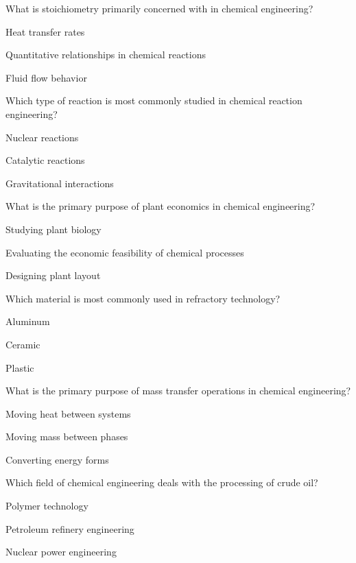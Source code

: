 \begin{enhancedmcq}{What is stoichiometry primarily concerned with in chemical engineering?}
\item Heat transfer rates
\item Quantitative relationships in chemical reactions
\item Fluid flow behavior

\end{enhancedmcq}
\begin{enhancedmcq}{Which type of reaction is most commonly studied in chemical reaction engineering?}
\item Nuclear reactions
\item Catalytic reactions
\item Gravitational interactions

\end{enhancedmcq}
\begin{enhancedmcq}{What is the primary purpose of plant economics in chemical engineering?}
\item Studying plant biology
\item Evaluating the economic feasibility of chemical processes
\item Designing plant layout

\end{enhancedmcq}
\begin{enhancedmcq}{Which material is most commonly used in refractory technology?}
\item Aluminum
\item Ceramic
\item Plastic

\end{enhancedmcq}
\begin{enhancedmcq}{What is the primary purpose of mass transfer operations in chemical engineering?}
\item Moving heat between systems
\item Moving mass between phases
\item Converting energy forms

\end{enhancedmcq}
\begin{enhancedmcq}{Which field of chemical engineering deals with the processing of crude oil?}
\item Polymer technology
\item Petroleum refinery engineering
\item Nuclear power engineering

\end{enhancedmcq}
